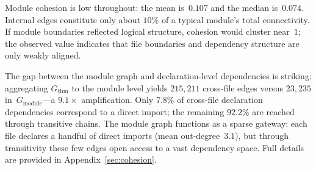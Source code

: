 Module cohesion is low throughout: the mean is~$0.107$ and the median is~$0.074$. Internal edges constitute only about $10\%$ of a typical module's total connectivity. If module boundaries reflected logical structure, cohesion would cluster near~$1$; the observed value indicates that file boundaries and dependency structure are only weakly aligned.

The gap between the module graph and declaration-level dependencies is striking: aggregating $G_{\mathrm{thm}}$ to the module level yields $215{,}211$ cross-file edges versus $23{,}235$ in~$G_{\mathrm{module}}$---a $9.1\times$ amplification. Only $7.8\%$ of cross-file declaration dependencies correspond to a direct import; the remaining $92.2\%$ are reached through transitive chains. The module graph functions as a sparse gateway: each file declares a handful of direct imports (mean out-degree~$3.1$), but through transitivity these few edges open access to a vast dependency space. Full details are provided in Appendix~\ref{sec:cohesion}.

